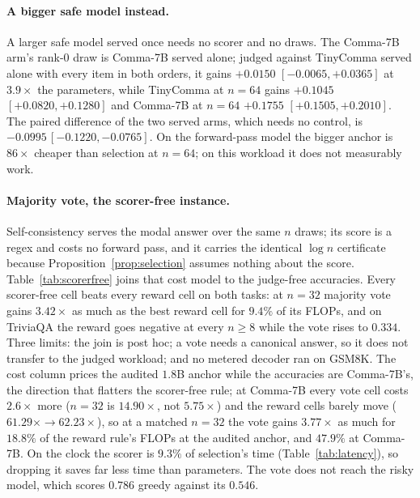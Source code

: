 \paragraph{A bigger safe model instead.}\label{app:biggeranchor}
A larger safe model served once needs no scorer and no draws. The Comma-7B arm's rank-$0$ draw is
Comma-7B served alone; judged against TinyComma served alone with every item in both orders, it gains
$+0.0150$ $[-0.0065, +0.0365]$ at $3.9\times$ the parameters, while TinyComma at $n=64$ gains $+0.1045$
$[+0.0820, +0.1280]$ and Comma-7B at $n=64$ $+0.1755$ $[+0.1505, +0.2010]$. The paired difference of
the two served arms, which needs no control, is $-0.0995\,[-0.1220,-0.0765]$. On the forward-pass model
the bigger anchor is $86\times$ cheaper than selection at $n=64$; on this workload it does not measurably
work.

\paragraph{Majority vote, the scorer-free instance.}\label{app:scorerfree}
Self-consistency serves the modal answer over the same $n$ draws; its score is a regex and costs no
forward pass, and it carries the identical $\log n$ certificate because Proposition~\ref{prop:selection}
assumes nothing about the score. Table~\ref{tab:scorerfree} joins that cost model to the judge-free
accuracies. Every scorer-free cell beats every reward cell on both tasks: at $n=32$ majority vote gains
$3.42\times$ as much as the best reward cell for $9.4\%$ of its FLOPs, and on TriviaQA the reward goes
negative at every $n \ge 8$ while the vote rises to $0.334$. Three limits: the join is post hoc; a vote
needs a canonical answer, so it does not transfer to the judged workload; and no metered decoder ran on
GSM8K. The cost column prices the audited $1.8$B anchor while the accuracies are Comma-7B's, the direction that flatters the scorer-free rule; at Comma-7B
every vote cell costs $2.6\times$ more ($n=32$ is $14.90\times$, not $5.75\times$) and the reward cells
barely move ($61.29\times \to 62.23\times$), so at a matched $n=32$ the vote gains $3.77\times$ as much for $18.8\%$ of the reward rule's FLOPs at the audited anchor, and $47.9\%$ at Comma-7B. On the clock the scorer is $9.3\%$ of selection's
time (Table~\ref{tab:latency}), so dropping it saves far less time than parameters. The vote does not
reach the risky model, which scores $0.786$ greedy against its $0.546$.

